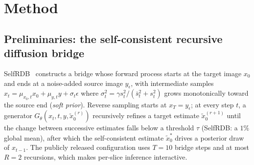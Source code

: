 \documentclass[11pt]{article}
\begin{document}


\section{Method}
\label{sec:method}

\subsection{Preliminaries: the self-consistent recursive diffusion bridge}
SelfRDB~\cite{arslan2025selfrdb} constructs a bridge whose forward process
starts at the target image $x_0$ and ends at a noise-added source image
$y_\epsilon$, with intermediate samples
$x_t=\mu_{x_0,t}x_0+\mu_{y,t}y+\sigma_t\epsilon$ where
$\sigma_t^2=\gamma s_t^2/(\bar s_t^2+s_t^2)$ grows monotonically toward the
source end (\emph{soft prior}). Reverse sampling starts at $x_T=y_\epsilon$;
at every step $t$, a generator
$G_\theta(x_t,t,y,\tilde x_0^{(r)})$ recursively refines a target estimate
$\tilde x_0^{(r+1)}$ until the change between successive estimates falls below
a threshold $\tau$ (SelfRDB: a $1\%$ global mean), after which the
self-consistent estimate $\tilde x_0^{\ast}$ drives a posterior draw of
$x_{t-1}$. The publicly released configuration uses $T{=}10$ bridge steps and
at most $R{=}2$ recursions, which makes per-slice inference interactive.
\end{document}
